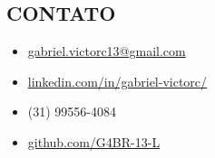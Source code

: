 \begin{framed}
    \section{CONTATO}
    \begin{itemize}[itemsep=1ex]
      \item {\Large{}} \href{mailto:gabriel.victorc13@gmail.com}{gabriel.victorc13@gmail.com}
      \item {\Large{}} \href{https://linkedin.com/in/gabriel-victorc/}{linkedin.com/in/gabriel-victorc/}
      \item {\Large{}} (31) 99556-4084
      \item {\Large{}} \href{https://github.com/G4BR-13-L}{github.com/G4BR-13-L}
    \end{itemize}
  \end{framed}